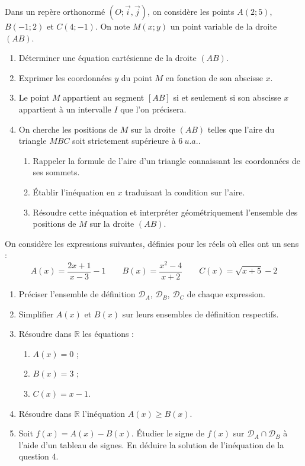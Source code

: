 \documentclass[11pt]{article}
\begin{document}
\begin{exercice}
Dans un repère orthonormé $(O; \vec{i}, \vec{j})$, on considère les points $A(2; 5)$, $B(-1; 2)$ et $C(4; -1)$.
On note $M(x; y)$ un point variable de la droite $(AB)$.
\begin{enumerate}
    \item Déterminer une équation cartésienne de la droite $(AB)$.
    \item Exprimer les coordonnées $y$ du point $M$ en fonction de son abscisse $x$.
    \item Le point $M$ appartient au segment $[AB]$ si et seulement si son abscisse $x$ appartient à un intervalle $I$ que l'on précisera.
    \item On cherche les positions de $M$ sur la droite $(AB)$ telles que l'aire du triangle $MBC$ soit strictement supérieure à $\SI{6}{u.a.}$.
    \begin{enumerate}
        \item Rappeler la formule de l'aire d'un triangle connaissant les coordonnées de ses sommets.
        \item Établir l'inéquation en $x$ traduisant la condition sur l'aire.
        \item Résoudre cette inéquation et interpréter géométriquement l'ensemble des positions de $M$ sur la droite $(AB)$.
    \end{enumerate}
\end{enumerate}
\end{exercice}

\begin{exercice}
On considère les expressions suivantes, définies pour les réels où elles ont un sens :
\[
A(x) = \frac{2x+1}{x-3} - 1 \qquad
B(x) = \frac{x^2 - 4}{x+2} \qquad
C(x) = \sqrt{x+5} - 2
\]
\begin{enumerate}
    \item Préciser l'ensemble de définition $\mathcal{D}_A$, $\mathcal{D}_B$, $\mathcal{D}_C$ de chaque expression.
    \item Simplifier $A(x)$ et $B(x)$ sur leurs ensembles de définition respectifs.
    \item Résoudre dans $\mathbb{R}$ les équations :
    \begin{enumerate}
        \item $A(x) = 0$ ;
        \item $B(x) = 3$ ;
        \item $C(x) = x - 1$.
    \end{enumerate}
    \item Résoudre dans $\mathbb{R}$ l'inéquation $A(x) \geqslant B(x)$.
    \item Soit $f(x) = A(x) - B(x)$. Étudier le signe de $f(x)$ sur $\mathcal{D}_A \cap \mathcal{D}_B$ à l'aide d'un tableau de signes. En déduire la solution de l'inéquation de la question 4.
\end{enumerate}
\end{exercice}
\end{document}
